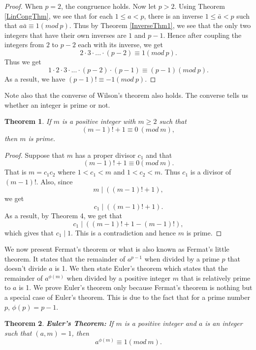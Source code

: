 \documentclass[12pt,letterpaper]{book}
\newtheorem{theorem}{Theorem}
\begin{document}
\begin{proof}
When $p=2$, the congruence holds.  Now let $p>2$.  Using Theorem \ref{LinCongThm},
we see that for each $1\leq a< p$, there is an inverse $1\leq
\bar{a}< p$ such that $a\bar{a}\equiv 1(mod \ p)$.  Thus by
Theorem \ref{InverseThm1}, we see that the only two integers that have their own
inverses are $1$ and $p-1$. Hence after coupling the integers from $2$
to $p-2$ each with its inverse, we get
\begin{equation*}
2\cdot 3\cdot...\cdot(p-2)\equiv 1(mod \ p).
\end{equation*}
Thus we get
\begin{equation*}
1\cdot 2\cdot 3\cdot ...\cdot (p-2)\cdot(p-1)\equiv (p-1)(mod \ p).
\end{equation*}
As a result, we have $(p-1)!\equiv -1(mod \ p)$.
\end{proof}

Note also that the converse of Wilson's theorem also holds.  The
converse tells us whether an integer is prime or not.

\begin{theorem}
If $m$ is a positive integer with $m\geq 2$ such that
\begin{equation*}
(m-1)!+1\equiv 0 \ (mod \ m),
\end{equation*}
then $m$ is prime.
\end{theorem}
\begin{proof}
Suppose that $m$ has a proper divisor $c_1$ and that
\begin{equation*}
(m-1)!+1\equiv 0(mod \ m).
\end{equation*}
That is $m=c_1c_2$ where $1<c_1<m$ and $1<c_2<m$.  Thus $c_1$ is a
divisor of $(m-1)!$. Also, since
\begin{equation*}
m\mid ((m-1)!+1),
\end{equation*}
we get
\begin{equation*}
c_1\mid ((m-1)!+1).
\end{equation*}
As a result, by Theorem 4, we get that
\begin{equation*}
c_1\mid ((m-1)!+1-(m-1)!),
\end{equation*}
which gives that $c_1\mid 1$.  This is a contradiction and hence $m$
is prime.
\end{proof}

We now present Fermat's theorem or what is also known as Fermat's
little theorem.  It states that the remainder of $a^{p-1}$  when
divided by a prime $p$ that doesn't divide $a$ is 1. We then state
Euler's theorem which states that the remainder of $a^{\phi(m)}$
when divided by a positive integer $m$ that is relatively prime to
$a$ is 1. We prove Euler's theorem only because Fermat's theorem is
nothing but a special case of Euler's theorem. This is due to the
fact that for a prime number $p$, $\phi(p)=p-1$. 
\begin{theorem}\textbf{Euler's Theorem:}
If $m$ is a positive integer and $a$ is an integer such that
$(a,m)=1$, then
\begin{equation*}
a^{\phi(m)}\equiv 1(mod \ m).
\end{equation*}
\end{theorem}
\end{document}
